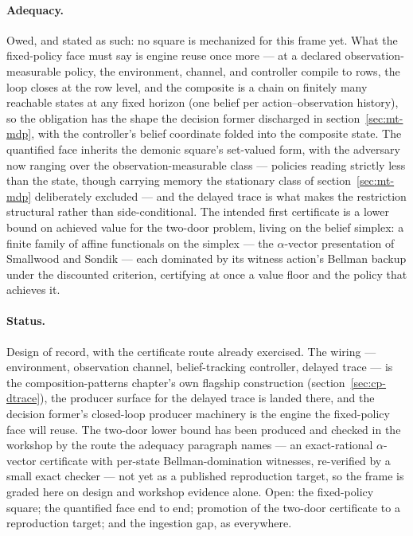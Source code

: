 \paragraph{Adequacy.} Owed, and stated as such: no square is
mechanized for this frame yet.  What the fixed-policy face must say
is engine reuse once more --- at a declared observation-measurable
policy, the environment, channel, and controller compile to rows, the
loop closes at the row level, and the composite is a chain on
finitely many reachable states at any fixed horizon (one belief per
action--observation history), so the obligation has the shape the decision
former discharged in section~\ref{sec:mt-mdp}, with the controller's
belief coordinate folded into the composite state.  The quantified
face inherits the demonic square's set-valued form, with the
adversary now ranging over the observation-measurable class ---
policies reading strictly less than the state, though carrying memory
the stationary class of section~\ref{sec:mt-mdp} deliberately
excluded --- and the delayed trace is what makes the restriction
structural rather than side-conditional.  The intended first
certificate is a lower bound on achieved value for the two-door
problem, living on the belief simplex: a finite family of affine
functionals on the simplex --- the $\alpha$-vector presentation of
Smallwood and Sondik \cite{smallwood-sondik-1973} --- each dominated
by its witness action's Bellman backup under the discounted
criterion, certifying at once a value floor and the policy that
achieves it.

\paragraph{Status.} Design of record, with the certificate route
already exercised.  The wiring --- environment,
observation channel, belief-tracking controller, delayed trace --- is
the composition-patterns chapter's own flagship construction
(section~\ref{sec:cp-dtrace}), the producer surface for the delayed
trace is landed there, and the decision former's closed-loop producer
machinery is the engine the fixed-policy face will reuse.  The
two-door lower bound has been produced and checked in the workshop by
the route the adequacy paragraph names --- an exact-rational
$\alpha$-vector certificate with per-state Bellman-domination
witnesses, re-verified by a small exact checker --- not yet as a
published reproduction target, so the frame is graded here on design
and workshop evidence alone.  Open: the fixed-policy square; the
quantified face end to end; promotion of the two-door certificate to
a reproduction target; and the ingestion gap, as everywhere.

